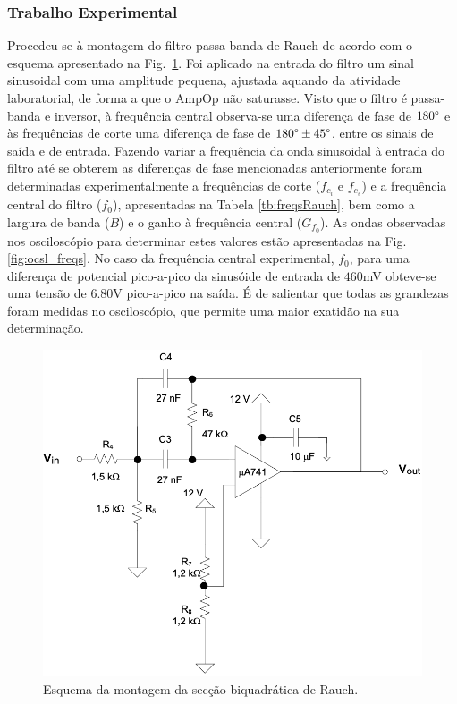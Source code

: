 \subsubsection{Trabalho Experimental}
Procedeu-se à montagem do filtro passa-banda de Rauch de acordo com o esquema apresentado na Fig.~\ref{fig:passa_banda_Rauch}. Foi aplicado na entrada do filtro um sinal sinusoidal com uma amplitude pequena, ajustada aquando da atividade laboratorial, de forma a que o AmpOp não saturasse. Visto que o filtro é passa-banda e inversor, à frequência central observa-se uma diferença de fase de $180 \degree$ e às frequências de corte uma diferença de fase de $180\degree \pm 45 \degree$, entre os sinais de saída e de entrada.  Fazendo variar a frequência da onda sinusoidal à entrada do filtro até se obterem as diferenças de fase mencionadas anteriormente foram determinadas experimentalmente a frequências de corte ($f_{c_i}$ e $f_{c_s}$) e a frequência central do filtro ($f_0$), apresentadas na Tabela \ref{tb:freqsRauch}, bem como a largura de banda ($B$) e o ganho à frequência central ($G_{f_0}$). As ondas observadas nos osciloscópio para determinar estes valores estão apresentadas na Fig. \ref{fig:ocsl_freqs}. No caso da frequência central experimental, $f_0$, para uma diferença de potencial pico-a-pico da sinusóide de entrada de $460$mV obteve-se uma tensão de $6.80$V pico-a-pico na saída. É de salientar que todas as grandezas foram medidas no osciloscópio, que permite uma maior exatidão na sua determinação.

\begin{figure}[ht]
    \centering
    \includegraphics[width = 0.7 \textwidth]{Imagens/SecRauch.png}
    \caption{Esquema da montagem da secção biquadrática de Rauch.}
    \label{fig:passa_banda_Rauch} 
\end{figure}

